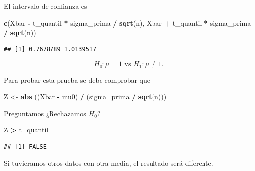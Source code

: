 \documentclass[
  12pt,
]{book}
\newenvironment{Shaded}{\begin{snugshade}}{\end{snugshade}}
\newcommand{\KeywordTok}[1]{\textcolor[rgb]{0.13,0.29,0.53}{\textbf{#1}}}
\newcommand{\NormalTok}[1]{#1}
\newcommand{\OperatorTok}[1]{\textcolor[rgb]{0.81,0.36,0.00}{\textbf{#1}}}
\newcommand{\StringTok}[1]{\textcolor[rgb]{0.31,0.60,0.02}{#1}}
\begin{document}
El intervalo de confianza es

\begin{Shaded}
\begin{Highlighting}[]
\KeywordTok{c}\NormalTok{(Xbar }\OperatorTok{{-}}\StringTok{ }\NormalTok{t\_quantil }\OperatorTok{*}\StringTok{ }\NormalTok{sigma\_prima }\OperatorTok{/}\StringTok{ }\KeywordTok{sqrt}\NormalTok{(n), Xbar }\OperatorTok{+}\StringTok{ }\NormalTok{t\_quantil }\OperatorTok{*}\StringTok{ }\NormalTok{sigma\_prima }\OperatorTok{/}\StringTok{ }\KeywordTok{sqrt}\NormalTok{(n))}
\end{Highlighting}
\end{Shaded}

\begin{verbatim}
## [1] 0.7678789 1.0139517
\end{verbatim}

\[ H_0: \mu = 1 \text{ vs } H_1: \mu \ne 1.\]

Para probar esta prueba se debe comprobar que

\begin{Shaded}
\begin{Highlighting}[]
\NormalTok{Z \textless{}{-}}\StringTok{ }\KeywordTok{abs}\NormalTok{ ((Xbar }\OperatorTok{{-}}\StringTok{ }\NormalTok{mu0) }\OperatorTok{/}\StringTok{ }\NormalTok{(sigma\_prima }\OperatorTok{/}\StringTok{ }\KeywordTok{sqrt}\NormalTok{(n)))}
\end{Highlighting}
\end{Shaded}

Preguntamos ¿Rechazamos \(H_0\)?

\begin{Shaded}
\begin{Highlighting}[]
\NormalTok{Z }\OperatorTok{\textgreater{}}\StringTok{ }\NormalTok{t\_quantil}
\end{Highlighting}
\end{Shaded}

\begin{verbatim}
## [1] FALSE
\end{verbatim}

Si tuvieramos otros datos con otra media, el resultado será diferente.
\end{document}
